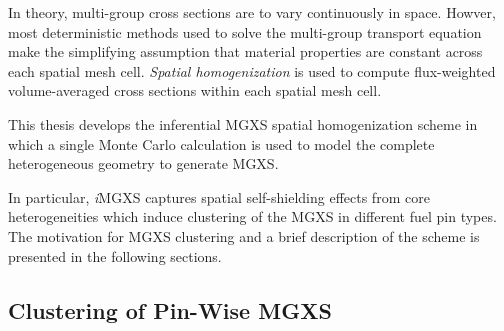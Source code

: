 \documentclass[12pt,twoside]{mitthesis-exec}
\begin{document}
In theory, multi-group cross sections are to vary continuously in space. Howver, most deterministic methods used to solve the multi-group transport equation make the simplifying assumption that material properties are constant across each spatial mesh cell. \textit{Spatial homogenization} is used to compute flux-weighted volume-averaged cross sections within each spatial mesh cell. 

This thesis develops the inferential MGXS spatial homogenization scheme in which a single Monte Carlo calculation is used to model the complete heterogeneous geometry to generate MGXS. 

In particular, \textit{i}MGXS captures spatial self-shielding effects from core heterogeneities which induce clustering of the MGXS in different fuel pin types. The motivation for MGXS clustering and a brief description of the scheme is presented in the following sections.

%
%
%
%
%
%

\subsection*{Clustering of Pin-Wise MGXS}
\end{document}
